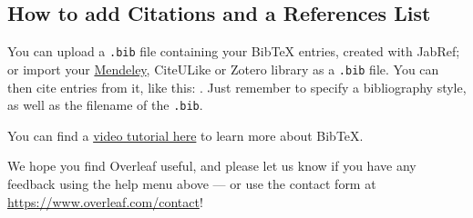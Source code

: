 \documentclass[a4paper]{article}
\begin{document}
\subsection{How to add Citations and a References List}

You can upload a \verb|.bib| file containing your BibTeX entries, created with JabRef; or import your \href{https://www.overleaf.com/blog/184}{Mendeley}, CiteULike or Zotero library as a \verb|.bib| file. You can then cite entries from it, like this: \cite{greenwade93}. Just remember to specify a bibliography style, as well as the filename of the \verb|.bib|.

You can find a \href{https://www.overleaf.com/help/97-how-to-include-a-bibliography-using-bibtex}{video tutorial here} to learn more about BibTeX.

We hope you find Overleaf useful, and please let us know if you have any feedback using the help menu above --- or use the contact form at \url{https://www.overleaf.com/contact}!




\end{document}
